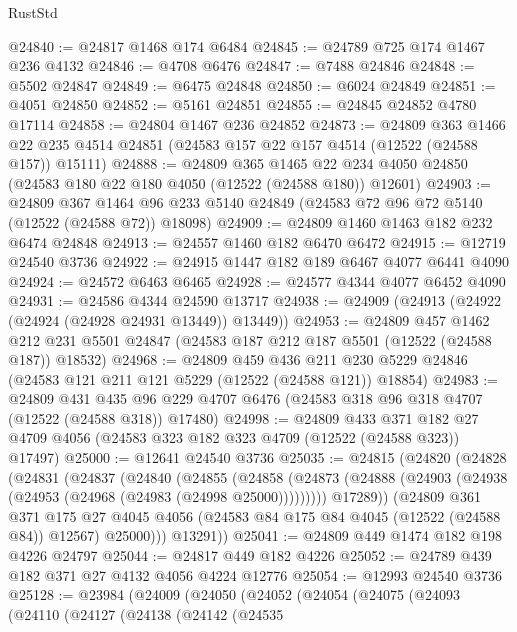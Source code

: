 \begin{lexlean}{RustStd}
\begin{coremodule}
@24840 := @24817 @1468 @174 @6484
@24845 := @24789 @725 @174 @1467 @236 @4132
@24846 := @4708 @6476
@24847 := @7488 @24846
@24848 := @5502 @24847
@24849 := @6475 @24848
@24850 := @6024 @24849
@24851 := @4051 @24850
@24852 := @5161 @24851
@24855 := @24845 @24852 @4780 @17114
@24858 := @24804 @1467 @236 @24852
@24873 := @24809
    @363
    @1466
    @22
    @235
    @4514
    @24851
    (@24583 @157 @22 @157 @4514 (@12522 (@24588 @157)) @15111)
@24888 := @24809
    @365
    @1465
    @22
    @234
    @4050
    @24850
    (@24583 @180 @22 @180 @4050 (@12522 (@24588 @180)) @12601)
@24903 := @24809
    @367
    @1464
    @96
    @233
    @5140
    @24849
    (@24583 @72 @96 @72 @5140 (@12522 (@24588 @72)) @18098)
@24909 := @24809 @1460 @1463 @182 @232 @6474 @24848
@24913 := @24557 @1460 @182 @6470 @6472
@24915 := @12719 @24540 @3736
@24922 := @24915 @1447 @182 @189 @6467 @4077 @6441 @4090
@24924 := @24572 @6463 @6465
@24928 := @24577 @4344 @4077 @6452 @4090
@24931 := @24586 @4344 @24590 @13717
@24938 := @24909 (@24913 (@24922 (@24924 (@24928 @24931 @13449)) @13449))
@24953 := @24809
    @457
    @1462
    @212
    @231
    @5501
    @24847
    (@24583 @187 @212 @187 @5501 (@12522 (@24588 @187)) @18532)
@24968 := @24809
    @459
    @436
    @211
    @230
    @5229
    @24846
    (@24583 @121 @211 @121 @5229 (@12522 (@24588 @121)) @18854)
@24983 := @24809
    @431
    @435
    @96
    @229
    @4707
    @6476
    (@24583 @318 @96 @318 @4707 (@12522 (@24588 @318)) @17480)
@24998 := @24809
    @433
    @371
    @182
    @27
    @4709
    @4056
    (@24583 @323 @182 @323 @4709 (@12522 (@24588 @323)) @17497)
@25000 := @12641 @24540 @3736
@25035 := @24815
    (@24820
      (@24828
        (@24831
          (@24837
            (@24840
              (@24855
                (@24858
                  (@24873 (@24888 (@24903 (@24938 (@24953 (@24968 (@24983 (@24998 @25000)))))))))
                @17289))
            (@24809
              @361
              @371
              @175
              @27
              @4045
              @4056
              (@24583 @84 @175 @84 @4045 (@12522 (@24588 @84)) @12567)
              @25000)))
        @13291))
@25041 := @24809 @449 @1474 @182 @198 @4226 @24797
@25044 := @24817 @449 @182 @4226
@25052 := @24789 @439 @182 @371 @27 @4132 @4056 @4224 @12776
@25054 := @12993 @24540 @3736
@25128 := @23984
    (@24009
      (@24050
        (@24052
          (@24054
            (@24075
              (@24093
                (@24110
                  (@24127
                    (@24138
                      (@24142
                        (@24535

\end{coremodule}
\end{lexlean}

